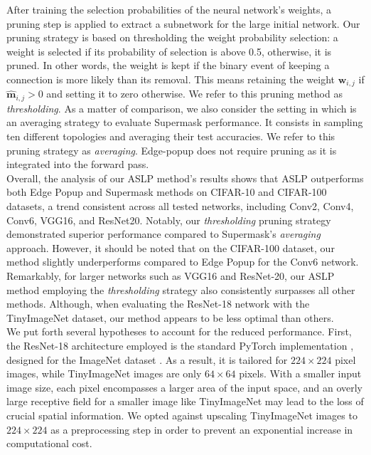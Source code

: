After training the selection probabilities of the neural network's weights, a
pruning step is applied to extract a subnetwork for the large initial network.
Our pruning strategy is based on thresholding the weight probability selection:
a weight is selected if its probability of selection is above 0.5, otherwise, it
is pruned. In other words, the weight is kept if the binary event of keeping a
connection is more likely than its removal. This means retaining the weight
$\bm{w}_{i,j}$ if $\bm{\hat{m}}_{i,j} > 0$ and setting it to zero otherwise. We
refer to this pruning method as \textit{thresholding}. As a matter of comparison,
we also consider the setting in \citeauthor{DBLP:conf/nips/ZhouLLY19} which is
an averaging strategy to evaluate Supermask performance. It consists in sampling
ten different topologies and averaging their test accuracies. We refer to this
pruning strategy as \textit{averaging}. Edge-popup does not require pruning as it
is integrated into the forward pass. \\

Overall, the analysis of our ASLP method's results shows that ASLP outperforms
both Edge Popup and Supermask methods on CIFAR-10 and CIFAR-100 datasets, a
trend consistent across all tested networks, including Conv2, Conv4, Conv6,
VGG16, and ResNet20. Notably, our \textit{thresholding} pruning strategy
demonstrated superior performance compared to Supermask's \textit{averaging}
approach. However, it should be noted that on the CIFAR-100 dataset, our method
slightly underperforms compared to Edge Popup for the Conv6 network.\\

Remarkably, for larger networks such as VGG16 and ResNet-20, our ASLP method
employing the \textit{thresholding} strategy also consistently surpasses all
other methods. Although, when evaluating the ResNet-18 network with the
TinyImageNet dataset, our method appears to be less optimal than others. \\


We put forth several hypotheses to account for the reduced performance. First,
the ResNet-18 architecture employed is the standard PyTorch implementation
\cite{pytorch_resnet18}, designed for the ImageNet dataset
\cite{deng2009imagenet}. As a result, it is tailored for $224 \times 224$ pixel
images, while TinyImageNet images are only $64 \times 64$ pixels. With a
smaller input image size, each pixel encompasses a larger area of the input
space, and an overly large receptive field for a smaller image like TinyImageNet
may lead to the loss of crucial spatial information. We opted against upscaling
TinyImageNet images to $224 \times 224$ as a preprocessing step in order to
prevent an exponential increase in computational cost.\\

